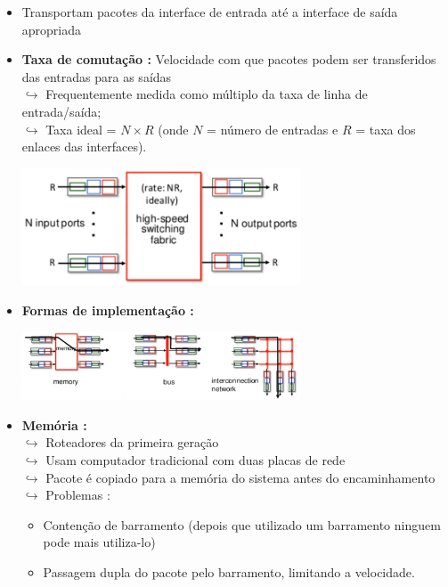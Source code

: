             \begin{itemize}[left=0.5cm, align=left, nosep]
                \item Transportam pacotes da interface de entrada até a interface de saída apropriada
                \item \textbf{Taxa de comutação :} Velocidade com que pacotes podem ser transferidos das entradas para as saídas \\
                    $\hookrightarrow$ Frequentemente medida como múltiplo da taxa de linha de entrada/saída; \\
                    $\hookrightarrow$ Taxa ideal = $N \times R$ (onde $N$ = número de entradas e $R$ = taxa dos enlaces das interfaces).
                    
                \begin{center}
                    \includegraphics[width=0.65\textwidth]{img/cap-04/taxa-de-comutacao.png}
                \end{center}

                \item \textbf{Formas de implementação :}
                \begin{center}
                    \includegraphics[width=0.65\textwidth]{img/cap-04/implementacao-matriz-de-comutacao.png}
                \end{center}

                \item \textbf{Memória :} \\ 
                    $\hookrightarrow$ Roteadores da primeira geração \\
                    $\hookrightarrow$ Usam computador tradicional com duas placas de rede \\
                    $\hookrightarrow$ Pacote é copiado para a memória do sistema antes do encaminhamento \\
                    $\hookrightarrow$ Problemas :
                    \begin{itemize} 
                        \item Contenção de barramento (depois que utilizado um barramento ninguem pode mais utiliza-lo)
                        \item Passagem dupla do pacote pelo barramento, limitando a velocidade.
                    \end{itemize}
            

\end{itemize}
